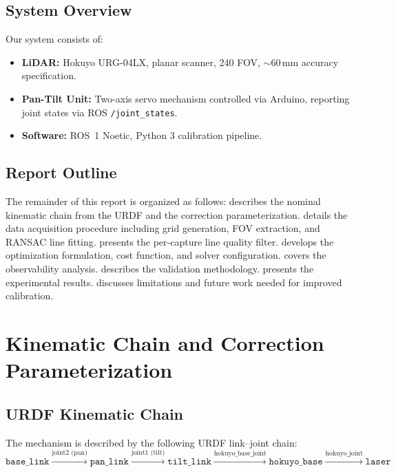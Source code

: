 \documentclass[12pt,a4paper]{article}
\newcommand{\code}[1]{\texttt{#1}}
\begin{document}
\subsection{System Overview}

Our system consists of:
\begin{itemize}[nosep]
    \item \textbf{LiDAR:} Hokuyo URG-04LX, planar scanner,
          240\textdegree{} FOV, $\sim$60\,mm accuracy specification.
    \item \textbf{Pan-Tilt Unit:} Two-axis servo mechanism controlled via
          Arduino, reporting joint states via ROS \code{/joint\_states}.
    \item \textbf{Software:} ROS~1 Noetic, Python 3 calibration pipeline.
\end{itemize}

\subsection{Report Outline}

The remainder of this report is organized as follows:
 describes the nominal kinematic chain from the URDF
and the correction parameterization.
 details the data acquisition procedure including
grid generation, FOV extraction, and RANSAC line fitting.
 presents the per-capture line quality filter.
 develops the optimization formulation, cost function,
and solver configuration.
 covers the observability analysis.
 describes the validation methodology.
 presents the experimental results.
 discusses limitations and future work needed for
improved calibration.


\section{Kinematic Chain and Correction Parameterization}
\label{sec:kinematics}

\subsection{URDF Kinematic Chain}

The mechanism is described by the following URDF link--joint chain:
\[
    \texttt{base\_link}
    \xrightarrow{\text{joint2 (pan)}}
    \texttt{pan\_link}
    \xrightarrow{\text{joint1 (tilt)}}
    \texttt{tilt\_link}
    \xrightarrow{\text{hokuyo\_base\_joint}}
    \texttt{hokuyo\_base}
    \xrightarrow{\text{hokuyo\_joint}}
    \texttt{laser}
\]
\end{document}
